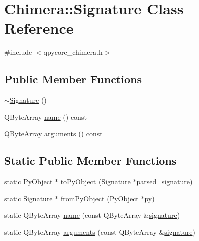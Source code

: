 \hypertarget{classChimera_1_1Signature}{}\section{Chimera\+:\+:Signature Class Reference}
\label{classChimera_1_1Signature}


{\ttfamily \#include $<$qpycore\+\_\+chimera.\+h$>$}

\subsection*{Public Member Functions}
\begin{DoxyCompactItemize}
\item 
\hyperlink{classChimera_1_1Signature_a00ef855a8be1c69b966b2a90e8126643}{$\sim$\+Signature} ()
\item 
Q\+Byte\+Array \hyperlink{classChimera_1_1Signature_a2ae2d532a7ebbd0b7345433545669d41}{name} () const 
\item 
Q\+Byte\+Array \hyperlink{classChimera_1_1Signature_a4ddf69f0b74d52175a8afe6ee0ff0ddb}{arguments} () const 
\end{DoxyCompactItemize}
\subsection*{Static Public Member Functions}
\begin{DoxyCompactItemize}
\item 
static Py\+Object $\ast$ \hyperlink{classChimera_1_1Signature_abbce0976f9ef91a23e03a1d499ee83be}{to\+Py\+Object} (\hyperlink{classChimera_1_1Signature}{Signature} $\ast$parsed\+\_\+signature)
\item 
static \hyperlink{classChimera_1_1Signature}{Signature} $\ast$ \hyperlink{classChimera_1_1Signature_a48731f3a25ecf70c8afddf3feaec8b9a}{from\+Py\+Object} (Py\+Object $\ast$py)
\item 
static Q\+Byte\+Array \hyperlink{classChimera_1_1Signature_ab48ff7728ab48b73a9b05fd9ee3a46ad}{name} (const Q\+Byte\+Array \&\hyperlink{classChimera_1_1Signature_a66bb1195f11c396b09e44ad5bed54ba1}{signature})
\item 
static Q\+Byte\+Array \hyperlink{classChimera_1_1Signature_ac63bdc6520e00351f2dbf19e7e5debd5}{arguments} (const Q\+Byte\+Array \&\hyperlink{classChimera_1_1Signature_a66bb1195f11c396b09e44ad5bed54ba1}{signature})
\end{DoxyCompactItemize}
